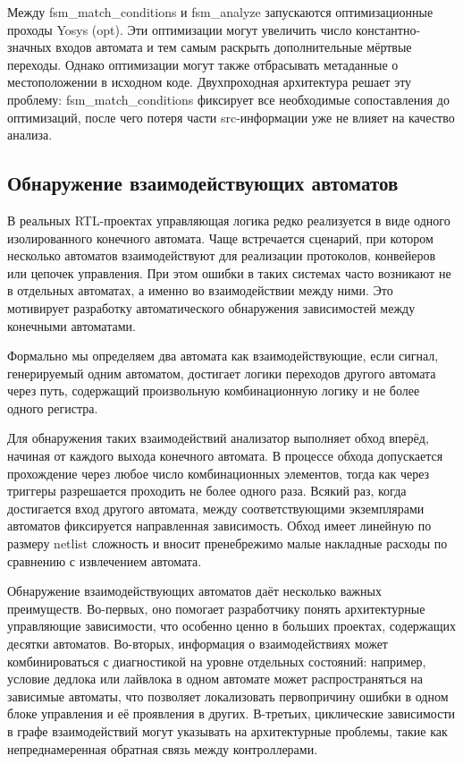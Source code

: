 Между fsm\_match\_conditions и fsm\_analyze запускаются оптимизационные проходы Yosys (opt).
Эти оптимизации могут увеличить число константно-значных входов автомата и тем самым раскрыть
дополнительные мёртвые переходы. Однако оптимизации могут также отбрасывать метаданные о
местоположении в исходном коде. Двухпроходная архитектура решает эту проблему:
fsm\_match\_conditions фиксирует все необходимые сопоставления до оптимизаций, после чего
потеря части src-информации уже не влияет на качество анализа.

\subsection{Обнаружение взаимодействующих автоматов}

В реальных RTL-проектах управляющая логика редко реализуется в виде одного изолированного
конечного автомата. Чаще встречается сценарий, при котором несколько автоматов взаимодействуют
для реализации протоколов, конвейеров или цепочек управления. При этом ошибки в таких системах
часто возникают не в отдельных автоматах, а именно во взаимодействии между ними. Это мотивирует
разработку автоматического обнаружения зависимостей между конечными автоматами.

Формально мы определяем два автомата как взаимодействующие, если сигнал, генерируемый одним
автоматом, достигает логики переходов другого автомата через путь, содержащий произвольную
комбинационную логику и не более одного регистра.

Для обнаружения таких взаимодействий анализатор выполняет обход вперёд, начиная от каждого
выхода конечного автомата. В процессе обхода допускается прохождение через любое число
комбинационных элементов, тогда как через триггеры разрешается проходить не более одного раза.
Всякий раз, когда достигается вход другого автомата, между соответствующими экземплярами
автоматов фиксируется направленная зависимость. Обход имеет линейную по размеру netlist сложность
и вносит пренебрежимо малые накладные расходы по сравнению с извлечением автомата.

Обнаружение взаимодействующих автоматов даёт несколько важных преимуществ. Во-первых, оно помогает
разработчику понять архитектурные управляющие зависимости, что особенно ценно в больших проектах,
содержащих десятки автоматов. Во-вторых, информация о взаимодействиях может комбинироваться с
диагностикой на уровне отдельных состояний: например, условие дедлока или лайвлока в одном
автомате может распространяться на зависимые автоматы, что позволяет локализовать первопричину
ошибки в одном блоке управления и её проявления в других. В-третьих, циклические зависимости
в графе взаимодействий могут указывать на архитектурные проблемы, такие как
непреднамеренная обратная связь между контроллерами.
